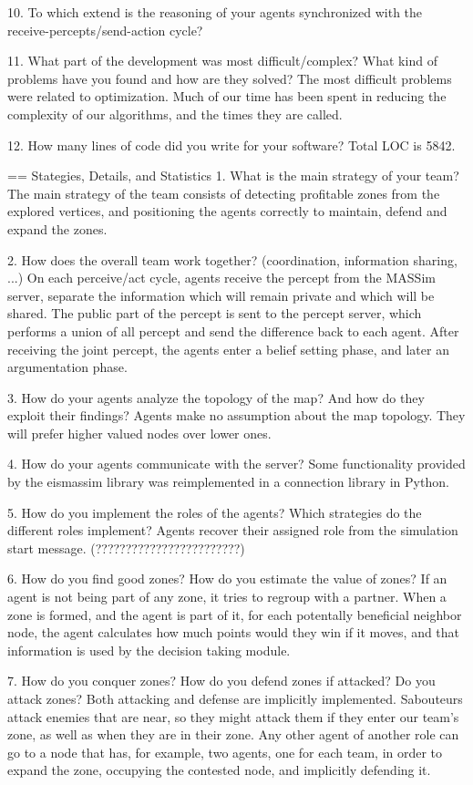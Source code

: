\begin{question}
\begin{question}
10. To which extend is the reasoning of your agents synchronized with the
receive-percepts/send-action cycle?


11. What part of the development was most difficult/complex? What kind of
problems have you found and how are they solved?  The most difficult problems
were related to optimization. Much of our time has been spent in reducing the
complexity of our algorithms, and the times they are called.

12. How many lines of code did you write for your software?  Total LOC is
5842.

== Stategies, Details, and Statistics
1. What is the main strategy of your
team?  The main strategy of the team consists of detecting profitable zones
from the explored vertices, and positioning the agents correctly to maintain,
defend and expand the zones.

2. How does the overall team work together? (coordination, information
sharing, ...) On each perceive/act cycle, agents receive the percept from the
MASSim server, separate the information which will remain private and which
will be shared.  The public part of the percept is sent to the percept server,
which performs a union of all percept and send the difference back to each
agent. After receiving the joint percept, the agents enter a belief setting
phase, and later an argumentation phase.


3. How do your agents analyze the topology of the map? And how do they exploit
their findings?  Agents make no assumption about the map topology. They will
prefer higher valued nodes over lower ones.

4. How do your agents communicate with the server?  Some functionality
provided by the eismassim library was reimplemented in a connection library in
Python.

5. How do you implement the roles of the agents? Which strategies do the
different roles implement?  Agents recover their assigned role from the
simulation start message.  (????????????????????????)

6. How do you find good zones? How do you estimate the value of zones?  If an
agent is not being part of any zone, it tries to regroup with a partner.  When
a zone is formed, and the agent is part of it, for each potentally beneficial
neighbor node, the agent calculates how much points would they win if it
moves, and that information is used by the decision taking module.

7. How do you conquer zones? How do you defend zones if attacked? Do you
attack zones?  Both attacking and defense are implicitly implemented.
Sabouteurs attack enemies that are near, so they might attack them if they
enter our team's zone, as well as when they are in their zone. Any other agent
of another role can go to a node that has, for example, two agents, one for
each team, in order to expand the zone, occupying the contested node, and
implicitly defending it.



\end{question}
\end{question}
